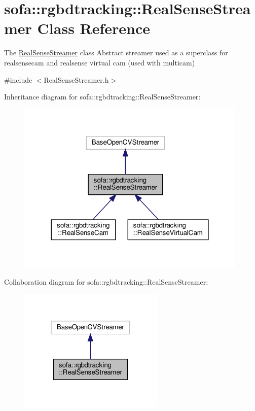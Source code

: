 \hypertarget{classsofa_1_1rgbdtracking_1_1_real_sense_streamer}{}\section{sofa\+:\+:rgbdtracking\+:\+:Real\+Sense\+Streamer Class Reference}
\label{classsofa_1_1rgbdtracking_1_1_real_sense_streamer}


The \hyperlink{classsofa_1_1rgbdtracking_1_1_real_sense_streamer}{Real\+Sense\+Streamer} class Abstract streamer used as a superclass for realsensecam and realsense virtual cam (used with multicam)  




{\ttfamily \#include $<$Real\+Sense\+Streamer.\+h$>$}



Inheritance diagram for sofa\+:\+:rgbdtracking\+:\+:Real\+Sense\+Streamer\+:\nopagebreak
\begin{figure}[H]
\begin{center}
\leavevmode
\includegraphics[width=312pt]{classsofa_1_1rgbdtracking_1_1_real_sense_streamer__inherit__graph}
\end{center}
\end{figure}


Collaboration diagram for sofa\+:\+:rgbdtracking\+:\+:Real\+Sense\+Streamer\+:\nopagebreak
\begin{figure}[H]
\begin{center}
\leavevmode
\includegraphics[width=196pt]{classsofa_1_1rgbdtracking_1_1_real_sense_streamer__coll__graph}
\end{center}
\end{figure}
